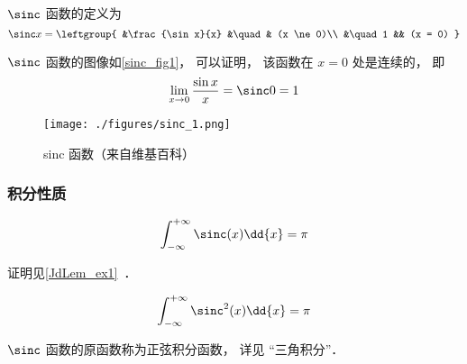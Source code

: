

$\sinc$ 函数的定义为
\begin{equation}
\sinc x = 
\leftgroup{
&\frac{\sin x}{x} &\quad & (x \ne 0)\\
&\quad 1 && (x = 0)
}\end{equation}

$\sinc$ 函数的图像如\autoref{sinc_fig1}， 可以证明， 该函数在 $x=0$ 处是连续的， 即
\begin{equation}
\lim_{x \to 0}\frac{\sin x}{x} = \sinc 0 = 1
\end{equation}

\begin{figure}[ht]
\centering
\texttt{[image: ./figures/sinc\_1.png]}
\caption{sinc 函数（来自维基百科）} \label{sinc_fig1}
\end{figure}

\subsubsection{积分性质}
\begin{equation}\label{sinc_eq2}
\int_{-\infty}^{+\infty} \sinc(x) \dd{x} = \pi
\end{equation}

证明见\autoref{JdLem_ex1}~．

\begin{equation}\label{sinc_eq1}
\int_{-\infty}^{+\infty} \sinc^2(x) \dd{x} = \pi
\end{equation}

$\sinc$ 函数的原函数称为正弦积分函数， 详见 “三角积分”．
